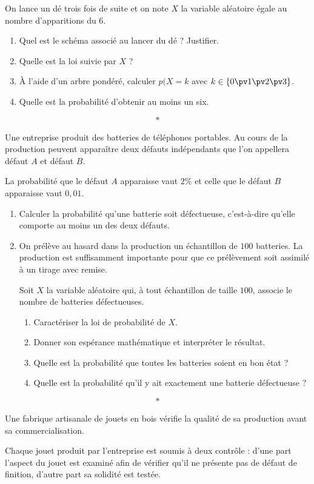 \documentclass[10pt,openright,twoside,french]{book}
\begin{document}

\exo On lance un dé trois fois de suite et on note $X$ la variable aléatoire égale au nombre d'apparitions du $6$.
\begin{enumerate}
    \item Quel est le schéma associé au lancer du dé ? Justifier.
    \item Quelle est la loi suivie par $X$ ?
    \item À l'aide d'un arbre pondéré, calculer $p(X = k$ avec $k \in \{0 \pv 1 \pv 2 \pv 3\}$.
    \item Quelle est la probabilité d'obtenir au moins un six.
\end{enumerate}\[*\]

\exo Une entreprise produit des batteries de téléphones portables. Au cours de la production peuvent apparaître deux défauts indépendants que l'on appellera défaut $A$ et défaut $B$.\par
La probabilité que le défaut $A$ apparaisse vaut $2\%$ et celle que le défaut $B$ apparaisse vaut $0,01$.
\begin{enumerate}
    \item Calculer la probabilité qu'une batterie soit défectueuse, c'est-à-dire qu'elle comporte au moins un des deux défauts.
    \item On prélève au hasard dans la production un échantillon de $100$ batteries. La production est suffisamment importante pour que ce prélèvement soit assimilé à un tirage avec remise.\par
    Soit $X$ la variable aléatoire qui, à tout échantillon de taille $100$, associe le nombre de batteries défectueuses.
    \begin{enumerate}
        \item Caractériser la loi de probabilité de $X$.
        \item Donner son espérance mathématique et interpréter le résultat.
        \item Quelle est la probabilité que toutes les batteries soient en bon état ?
        \item Quelle est la probabilité qu'il y ait exactement une batterie défectueuse ?
    \end{enumerate}
\end{enumerate}\[*\]

\exo Une fabrique artisanale de jouets en bois vérifie la qualité de sa production avant sa commercialisation.\par
Chaque jouet produit par l'entreprise est soumis à deux contrôle : d'une part l'aspect du jouet est examiné afin de vérifier qu'il ne présente pas de défaut de finition, d'autre part sa solidité est testée.\par\medskip
\end{document}
